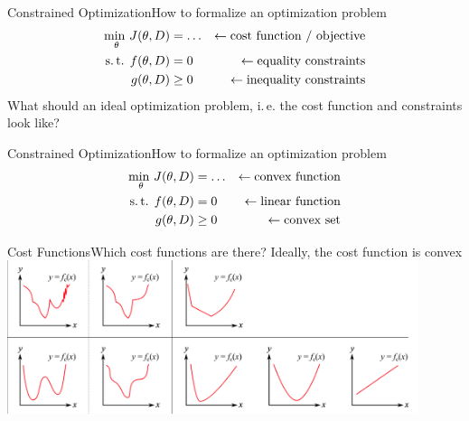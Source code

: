 \begin{frame}{Constrained Optimization}{How to formalize an optimization problem}
	\begin{align*}
		\underset{\theta}{\text{min }} J(\theta, D) &= \dots &\leftarrow\text{cost function / objective}\\
		\text{s.\,t. } f(\theta, D) &= 0 &\leftarrow\text{equality constraints}\\
		g(\theta, D) &\ge 0 &\leftarrow\text{inequality constraints}\\
	\end{align*}
	What should an ideal optimization problem, i.\,e. the cost function and constraints look like?
\end{frame}

\begin{frame}{Constrained Optimization}{How to formalize an optimization problem}
	\begin{align*}
		\underset{\theta}{\text{min }} J(\theta, D) &= \dots &\leftarrow\text{convex function}\\
		\text{s.\,t. } f(\theta, D) &= 0 &\leftarrow\text{linear function}\\
		g(\theta, D) &\ge 0 &\leftarrow\text{convex set}\\
	\end{align*}
\end{frame}

\begin{frame}{Cost Functions}{Which cost functions are there? Ideally, the cost function is convex}
	\\
	\vspace{0.4cm}
	\includegraphics[width=0.9\textwidth]{02_math/02_img/costfunctions.png}
\end{frame}

